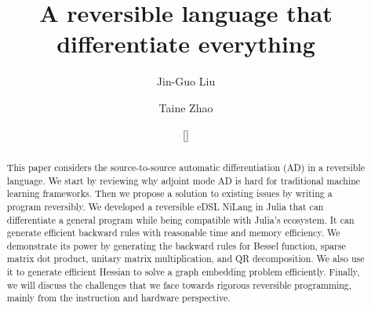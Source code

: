 \documentclass[aps,twocolumn,longbibliography,english,superscriptaddress]{revtex4-1}
\newcommand{\<}{\langle}
\renewcommand{\>}{\rangle}
\newcommand{\blue}[1]{[{\bf  \color{blue}{JG: #1}}]}
\theoremstyle{definition}\newtheorem{definition}{\textit{Definition}}
\begin{document}
\title{A reversible language that differentiate everything}


\author{Jin-Guo Liu}

\author{Taine Zhao}

\author{\blue{MLS's name here}}

\begin{abstract}
    This paper considers the source-to-source automatic differentiation (AD) in a reversible language. We start by reviewing why adjoint mode AD is hard for traditional machine learning frameworks. Then we propose a solution to existing issues by writing a program reversibly. We developed a reversible eDSL NiLang in Julia that can differentiate a general program while being compatible with Julia's ecosystem. It can generate efficient backward rules with reasonable time and memory efficiency. We demonstrate its power by generating the backward rules for Bessel function, sparse matrix dot product, unitary matrix multiplication, and QR decomposition. We also use it to generate efficient Hessian to solve a graph embedding problem efficiently. Finally, we will discuss the challenges that we face towards rigorous reversible programming, mainly from the instruction and hardware perspective.
\end{abstract}


\maketitle

\end{document}
